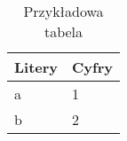 \begin{table}[h]
\centering
\begin{tabular}{|l|l|}
\hline
Litery & Cyfry \\
\hline
a      & 1     \\
\hline
b      & 2     \\
\hline
\end{tabular}
\label{tab:PB}
\caption{Przykładowa tabela}
\end{table}